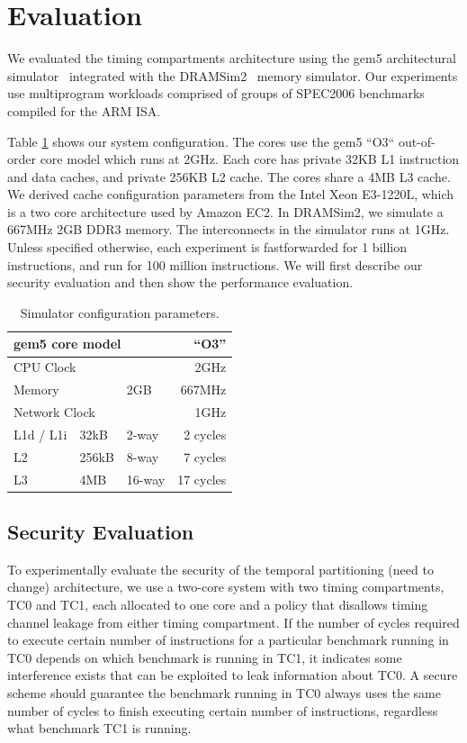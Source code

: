 \section{Evaluation}
We evaluated the timing compartments architecture using the gem5 architectural 
simulator~\cite{gem5} integrated with the DRAMSim2~\cite{DRAMSim2} 
memory simulator. Our experiments use multiprogram workloads 
comprised of groups of SPEC2006 benchmarks compiled for the ARM ISA. 

Table \ref{tab:config} shows our system configuration.
The cores use the gem5 ``O3`` out-of-order core model which runs at 2GHz. 
Each core has private 32KB L1 instruction and data caches, and private 256KB L2 
cache. The cores share a 4MB L3 cache. We derived cache configuration 
parameters from the Intel Xeon E3-1220L, which is a two core architecture used 
by Amazon EC2. In DRAMSim2, we simulate a 667MHz 2GB DDR3 memory. The 
interconnects in the simulator runs at 1GHz. Unless specified otherwise, each experiment is 
fastforwarded for 1 billion instructions, and run for 100 million 
instructions. We will first describe our security evaluation and then show
the performance evaluation.

\begin{table}
    \caption{Simulator configuration parameters.}
    \centering
    \begin{tabular}{|l|l|l|r|}
        \hline
        \multicolumn{3}{|l|}{gem5 core model} & ``O3''        \\\hline
        \multicolumn{3}{|l|}{CPU Clock}    & 2GHz             \\\hline
        \hline
        \multicolumn{2}{|l|}{Memory}             & 2GB    & 667MHz  \\\hline
        \hline
        \multicolumn{3}{|l|}{Network Clock}      & 1GHz \\\hline
        \hline
        L1d / L1i  & 32kB   & 2-way  & 2 cycles\\\hline
        L2         & 256kB  & 8-way  & 7 cycles \\\hline
        L3         & 4MB    & 16-way & 17 cycles  \\\hline
    \end{tabular}
    \label{tab:config}
\end{table}

\subsection{Security Evaluation}
To experimentally evaluate the security of the temporal partitioning (need to change)
architecture, we use a two-core system with two timing compartments, TC0 and TC1,
each allocated to one core and a policy that disallows timing channel leakage from
either timing compartment. If the number of cycles required to execute certain number of instructions 
for a particular benchmark running in TC0 depends on which benchmark is running in 
TC1, it indicates some interference exists that can be exploited to leak information about TC0. 
A secure scheme should guarantee the benchmark running in TC0 always uses the same number of cycles
to finish executing certain number of instructions, regardless what benchmark TC1 is running. 

